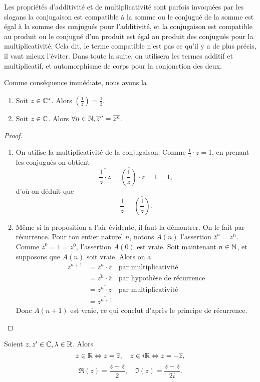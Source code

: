 \begin{remarque}
Les propriétés d'additivité et de multiplicativité sont parfois invoquées par les slogans \og la conjugaison est compatible à la somme\fg{} ou \og le conjugué de la somme est égal à la somme des conjugués\fg{} pour l'additivité, et \og la conjugaison est compatible au produit\fg{} ou \og le conjugué d'un produit est égal au produit des conjugués\fg{} pour la multiplicativité. Cela dit, le terme \og compatible\fg{} n'est pas ce qu'il y a de plus précis, il vaut mieux l'éviter. Dans toute la suite, on utilisera les termes \og additif\fg{} et \og multiplicatif\fg, et \og automorphisme de corps\fg{} pour la conjonction des deux.
\end{remarque}

Comme conséquence immédiate, nous avons la

\begin{proposition}
\begin{enumerate}
\item Soit $z\in\mathbb{C}^*$. Alors $\overline{\left(\frac{1}{z}\right)} = \frac{1}{\overline z}$.
\item Soit $z\in\mathbb{C}$. Alors $\forall n\in\mathbb{N}, \overline{z}^n = \overline{z^n}$.
\end{enumerate}
\end{proposition}

\begin{proof}
\begin{enumerate}
\item On utilise la multiplicativité de la conjugaison. Comme $\frac1z\cdot z=1$, en prenant les conjugués on obtient
\[ \overline{\frac1z\cdot z} = \overline{\left(\frac1z\right)}\cdot \overline{z} = \overline 1 = 1,\]
d'où on déduit que \[ \frac{1}{\overline z} = \overline{\left(\frac1z\right)}.\]
\item Même si la proposition a l'air évidente, il faut la démontrer. On le fait par récurrence. Pour tou entier naturel $n$, notons $A(n)$ l'assertion \og $\overline{z}^n = \overline{z^n}$\fg. Comme $\overline{z}^0=1=\overline{z^0}$, l'assertion $A(0)$ est vraie. Soit maintenant $n\in\mathbb{N}$, et supposons que $A(n)$ soit vraie. Alors on a 
\begin{align*}
\overline{z}^{n+1}
&=\overline{z}^{n}\cdot\overline{z} \quad \text{par multiplicativité}\\
&=\overline{z^n}\cdot \overline{z} \quad \text{par hypothèse de récurrence}\\
&=\overline{z^n\cdot z} \quad \text{par multiplicativité}\\
&=\overline{z^{n+1}}
\end{align*}
Donc $A(n+1)$ est vraie, ce qui conclut d'après le principe de récurrence.
\end{enumerate}
\end{proof}


\begin{proposition}
Soient $z, z' \in \mathbb{C}, \lambda\in\mathbb{R}$. Alors
\[z\in\mathbb{R} \Leftrightarrow z=\overline z,\quad z\in i\mathbb{R} \Leftrightarrow z=-\overline{z},\]
\[\Re(z) = \frac{z+\overline z}{2},\quad \Im(z) = \frac{z-\overline z}{2i}.\]
\end{proposition}
